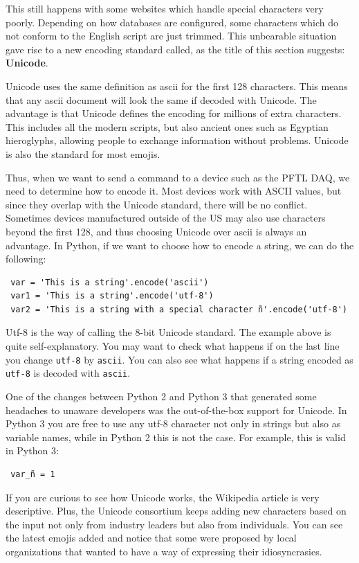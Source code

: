 This still happens with some websites which handle special characters very poorly. Depending on how databases are configured, some characters which do not conform to the English script are just trimmed. This unbearable situation gave rise to a new encoding standard called, as the title of this section suggests: \textbf{Unicode}.

Unicode uses the same definition as ascii for the first 128 characters. This means that any ascii document will look the same if decoded with Unicode. The advantage is that Unicode defines the encoding for millions of extra characters. This includes all the modern scripts, but also ancient ones such as Egyptian hieroglyphs, allowing people to exchange information without problems. Unicode is also the standard for most emojis.

Thus, when we want to send a command to a device such as the {PFTL DAQ}, we need to determine how to encode it. Most devices work with ASCII values, but since they overlap with the Unicode standard, there will be no conflict. Sometimes devices manufactured outside of the US may also use characters beyond the first 128, and thus choosing Unicode over ascii is always an advantage. In Python, if we want to choose how to encode a string, we can do the following:

\begin{verbatim}
 var = 'This is a string'.encode('ascii')
 var1 = 'This is a string'.encode('utf-8')
 var2 = 'This is a string with a special character ñ'.encode('utf-8')
\end{verbatim}

Utf-8 is the way of calling the 8-bit Unicode standard. The example above is quite self-explanatory. You may want to check what happens if on the last line you change \texttt{utf-8} by \texttt{ascii}. You can also see what happens if a string encoded as \texttt{utf-8} is decoded with \texttt{ascii}.

One of the changes between Python 2 and Python 3 that generated some headaches to unaware developers was the out-of-the-box support for Unicode. In Python 3 you are free to use any utf-8 character not only in strings but also as variable names, while in Python 2 this is not the case. For example, this is valid in Python 3:

\begin{verbatim}
 var_ñ = 1
\end{verbatim}

If you are curious to see how Unicode works, the Wikipedia article is very descriptive. Plus, the Unicode consortium keeps adding new characters based on the input not only from industry leaders but also from individuals. You can see the latest emojis added and notice that some were proposed by local organizations that wanted to have a way of expressing their idiosyncrasies.

